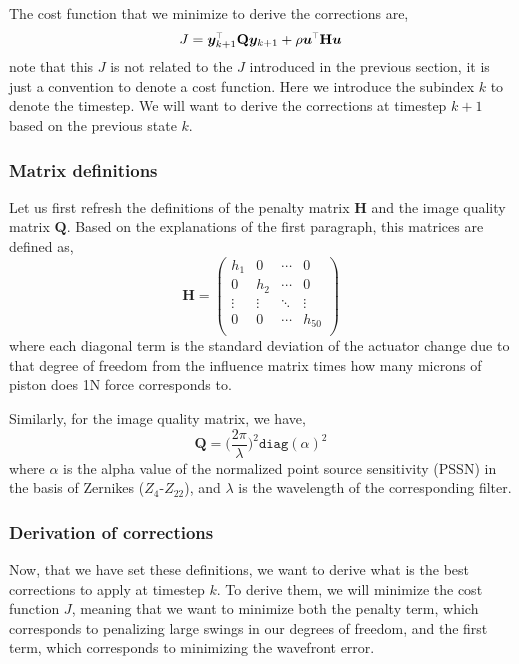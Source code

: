 \documentclass[SE,authoryear,toc]{lsstdoc}
\renewcommand{\v}[1]{\mathbf{#1}}
\newcommand{\tr}{\scalebox{0.6}{$\top$}}
\begin{document}
The cost function that we minimize to derive the corrections are, 
\begin{equation}
    J = \bm{y}_{k+1}^{\tr}\v{Q}\bm{y}_{k+1} + \rho \bm{u}^{\tr}\v{H}\bm{u}
\end{equation}
note that this $J$ is not related to the $J$ introduced in the previous section, it is just a convention to denote a cost function. Here we introduce the subindex $k$ to denote the timestep. We will want to derive the corrections at timestep $k+1$ based on the previous state $k$.

\subsubsection*{Matrix definitions}
Let us first refresh the definitions of the penalty matrix $\v{H}$ and the image quality matrix $\v{Q}$. Based on the explanations of the first paragraph, this matrices are defined as, 
\begin{equation}
    \v{H} = \left(
  \begin{array}{cccc}
    h_1 &   0     & \cdots & 0 \\
    0 &   h_2     & \cdots & 0 \\
    \vdots &   \vdots    & \ddots & \vdots \\
    0 &   0     & \cdots & h_{50}  \\
  \end{array}
\right)
\end{equation}
where each diagonal term is the standard deviation of the actuator change due to that degree of freedom from the influence matrix times how many microns of piston does 1N force corresponds to.

Similarly, for the image quality matrix, we have,
\begin{equation}
    \v{Q} = \Big(\frac{2\pi}{\lambda}\Big) ^2 \texttt{diag}(\alpha)^2
\end{equation}
where $\alpha$ is the alpha value of the normalized point source sensitivity (PSSN) in the basis of Zernikes ($Z_4$-$Z_{22}$), and $\lambda$ is the wavelength of the corresponding filter.

\subsubsection*{Derivation of corrections}
Now, that we have set these definitions, we want to derive what is the best corrections to apply at timestep $k$. To derive them, we will minimize the cost function $J$, meaning that we want to minimize both the penalty term, which corresponds to penalizing large swings in our degrees of freedom, and the first term, which corresponds to minimizing the wavefront error.
\end{document}
